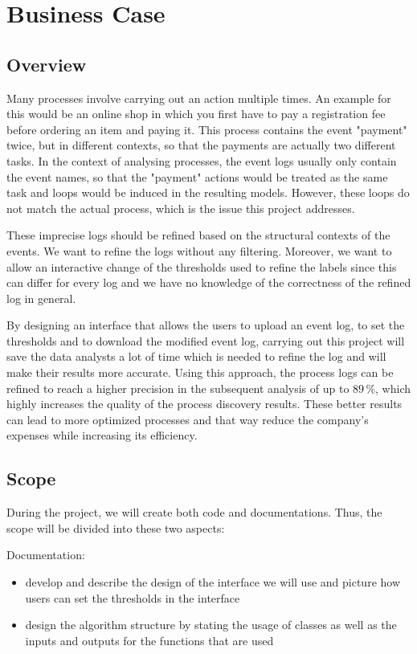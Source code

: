 \documentclass[12pt,bibtotoc,liststotoc,paper=a4,headings=small]{paper}
\begin{document}
\section{Business Case}

\subsection{Overview}

Many processes involve carrying out an action multiple times. An example for this would be an online shop in which you first have to pay a registration fee before ordering an item and paying it. This process contains the event "payment" twice, but in different contexts, so that the payments are actually two different tasks. In the context of analysing processes, the event logs usually only contain the event names, so that the "payment" actions would be treated as the same task and loops would be induced in the resulting models. However, these loops do not match the actual process, which is the issue this project addresses. 

These imprecise logs should be refined based on the structural contexts of the events. We want to refine the logs without any filtering. Moreover, we want to allow an interactive change of the thresholds used to refine the labels since this can differ for every log and we have no knowledge of the correctness of the refined log in general.

By designing an interface that allows the users to upload an event log, to set the thresholds and to download the modified event log, carrying out this project will save the data analysts a lot of time which is needed to refine the log and will make their results more accurate.  Using this approach, the process logs can be refined to reach a higher precision in the subsequent analysis of up to $89 \, \% $, which highly increases the quality of the process discovery results. These better results can lead to more optimized processes and that way reduce the company's expenses while increasing its efficiency. 

 


\subsection{Scope}

During the project, we will create both code and documentations. Thus, the scope will be divided into these two aspects:

Documentation: 
\begin{itemize}
	\item develop and describe the design of the interface we will use and picture how users can set the thresholds in the interface 
	\item design the algorithm structure by stating the usage of classes as well as the inputs and outputs for the functions that are used
	
\end{itemize} 
\end{document}
